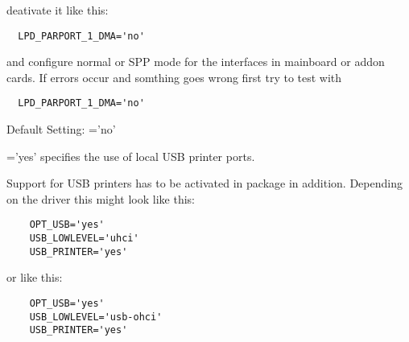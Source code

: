 \begin{description}
{  deativate it like this:

\begin{example}
\begin{verbatim}
  LPD_PARPORT_1_DMA='no'
\end{verbatim}
\end{example}

  and configure normal or SPP mode for the interfaces in mainboard or addon
  cards. If errors occur and somthing goes wrong first try to test with

\begin{example}
\begin{verbatim}
  LPD_PARPORT_1_DMA='no'
\end{verbatim}
\end{example}

  Default Setting: ='no'}



  ='yes' specifies the use of local
  USB printer ports.

  Support for USB printers has to be activated in package 
  in addition. Depending on the driver this might look like this:

\begin{example}
\begin{verbatim}
    OPT_USB='yes'
    USB_LOWLEVEL='uhci'
    USB_PRINTER='yes'
\end{verbatim}
\end{example}

    or like this:

\begin{example}
\begin{verbatim}
    OPT_USB='yes'
    USB_LOWLEVEL='usb-ohci'
    USB_PRINTER='yes'
\end{verbatim}
\end{example}



\end{description}
